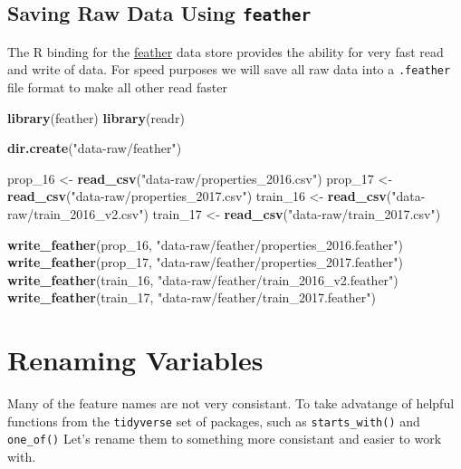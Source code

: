 \documentclass[]{book}
\newenvironment{Shaded}{\begin{snugshade}}{\end{snugshade}}
\newcommand{\KeywordTok}[1]{\textcolor[rgb]{0.13,0.29,0.53}{\textbf{#1}}}
\newcommand{\DecValTok}[1]{\textcolor[rgb]{0.00,0.00,0.81}{#1}}
\newcommand{\StringTok}[1]{\textcolor[rgb]{0.31,0.60,0.02}{#1}}
\newcommand{\NormalTok}[1]{#1}
\theoremstyle{definition}
\theoremstyle{definition}
\theoremstyle{definition}
\theoremstyle{remark}
\begin{document}
\subsection{\texorpdfstring{Saving Raw Data Using
\texttt{feather}}{Saving Raw Data Using feather}}\label{saving-raw-data-using-feather}

The R binding for the \href{https://github.com/wesm/feather}{feather}
data store provides the ability for very fast read and write of data.
For speed purposes we will save all raw data into a \texttt{.feather}
file format to make all other read faster

\begin{Shaded}
\begin{Highlighting}[]
\KeywordTok{library}\NormalTok{(feather)}
\KeywordTok{library}\NormalTok{(readr)}

\KeywordTok{dir.create}\NormalTok{(}\StringTok{"data-raw/feather"}\NormalTok{)}

\NormalTok{prop_}\DecValTok{16}\NormalTok{ <-}\StringTok{ }\KeywordTok{read_csv}\NormalTok{(}\StringTok{"data-raw/properties_2016.csv"}\NormalTok{)}
\NormalTok{prop_}\DecValTok{17}\NormalTok{ <-}\StringTok{ }\KeywordTok{read_csv}\NormalTok{(}\StringTok{"data-raw/properties_2017.csv"}\NormalTok{)}
\NormalTok{train_}\DecValTok{16}\NormalTok{ <-}\StringTok{ }\KeywordTok{read_csv}\NormalTok{(}\StringTok{"data-raw/train_2016_v2.csv"}\NormalTok{)}
\NormalTok{train_}\DecValTok{17}\NormalTok{ <-}\StringTok{ }\KeywordTok{read_csv}\NormalTok{(}\StringTok{"data-raw/train_2017.csv"}\NormalTok{)}

\KeywordTok{write_feather}\NormalTok{(prop_}\DecValTok{16}\NormalTok{, }\StringTok{"data-raw/feather/properties_2016.feather"}\NormalTok{)}
\KeywordTok{write_feather}\NormalTok{(prop_}\DecValTok{17}\NormalTok{, }\StringTok{"data-raw/feather/properties_2017.feather"}\NormalTok{)}
\KeywordTok{write_feather}\NormalTok{(train_}\DecValTok{16}\NormalTok{, }\StringTok{"data-raw/feather/train_2016_v2.feather"}\NormalTok{)}
\KeywordTok{write_feather}\NormalTok{(train_}\DecValTok{17}\NormalTok{, }\StringTok{"data-raw/feather/train_2017.feather"}\NormalTok{)}
\end{Highlighting}
\end{Shaded}

\section{Renaming Variables}\label{renaming-variables}

Many of the feature names are not very consistant. To take advatange of
helpful functions from the \texttt{tidyverse} set of packages, such as
\texttt{starts\_with()} and \texttt{one\_of()} Let's rename them to
something more consistant and easier to work with.
\end{document}
